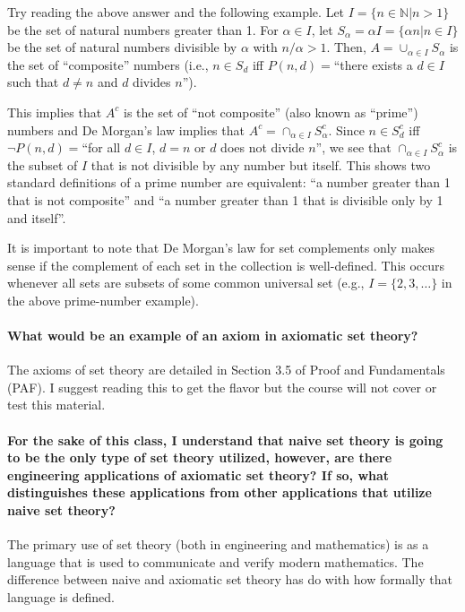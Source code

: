 \documentclass[10pt,english]{article}
\begin{document}
Try reading the above answer and the following example.
Let $I = \{n\in \mathbb{N}| n > 1\}$ be the set of natural numbers greater than 1.
For $\alpha \in I$, let $S_\alpha = \alpha I = \{ \alpha n | n \in I \}$ be the set of natural numbers divisible by $\alpha$ with $n/\alpha > 1$.
Then, $A = \cup_{\alpha \in I} S_\alpha$ is the set of ``composite'' numbers (i.e., $n\in S_d$ iff $P(n,d)=$``there exists a $d\in I$ such that $d \neq n$ and $d$ divides $n$'').

This implies that $A^c$ is the set of ``not composite'' (also known as ``prime'') numbers and De Morgan's law implies that $A^c = \cap_{\alpha \in I} S_{\alpha}^c$.
Since $n \in S_d^c$ iff $\neg P(n,d)=$``for all $d \in I$, $d=n$ or $d$ does not divide $n$'', we see that $\cap_{\alpha \in I} S_{\alpha}^c$ is the subset of $I$ that is not divisible by any number but itself.
This shows two standard definitions of a prime number are equivalent: ``a number greater than 1 that is not composite'' and ``a number greater than 1 that is divisible only by 1 and itself''.

It is important to note that De Morgan's law for set complements only makes sense if the complement of each set in the collection is well-defined.
This occurs whenever all sets are subsets of some common universal set (e.g., $I=\{2,3,\ldots\}$ in the above prime-number example).


\paragraph{What would be an example of an axiom in axiomatic set theory?}

The axioms of set theory are detailed in Section 3.5 of Proof and Fundamentals (PAF).
I suggest reading this to get the flavor but the course will not cover or test this material.

\paragraph{For the sake of this class, I understand that naive set theory is going to be the only type of set theory utilized, however, are there engineering applications of axiomatic set theory? If so, what distinguishes these applications from other applications that utilize naive set theory?}

The primary use of set theory (both in engineering and mathematics) is as a language that is used to communicate and verify modern mathematics.
The difference between naive and axiomatic set theory has do with how formally that language is defined.
\end{document}
